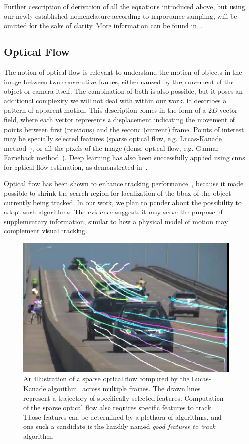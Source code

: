 Further description of derivation of all the equations introduced above, but using our newly established nomenclature according to importance sampling, will be omitted for the sake of clarity. More information can be found in~\cite{arulampalam2007particlefilter}.

\subsection{Optical Flow}
\label{ssec:OpticalFlow}

The notion of optical flow is relevant to understand the motion of objects in the image between two consecutive frames, either caused by the movement of the object or camera itself. The combination of both is also possible, but it poses an additional complexity we will not deal with within our work. It describes a pattern of apparent motion. This description comes in the form of a $2D$ vector field, where each vector represents a displacement indicating the movement of points between first (previous) and the second (current) frame. Points of interest may be specially selected features (sparse optical flow, e.g. Lucas-Kanade method~\cite{lucas1981lucaskanade}), or all the pixels of the image (dense optical flow, e.g. Gunnar-Farneback method~\cite{farneback2003motion}). Deep learning has also been successfully applied using \glspl{cnn} for optical flow estimation, as demonstrated in~\cite{dosovitskiy2015flownet}.

Optical flow has been shown to enhance tracking performance~\cite{lealtaixe2016siameseassoc}, because it made possible to shrink the search region for localization of the \gls{bbox} of the object currently being tracked. In our work, we plan to ponder about the possibility to adopt such algorithms. The evidence suggests it may serve the purpose of supplementary information, similar to how a physical model of motion may complement visual tracking.

\begin{figure}[t]
    \centerline{\includegraphics[width=0.5\linewidth]{figures/theoretical_foundations/opticalflow_lk.jpg}}
    \caption[Sparse optical flow]{An illustration of a sparse optical flow computed by the Lucas-Kanade algorithm~\cite{lucas1981lucaskanade} across multiple frames. The drawn lines represent a trajectory of specifically selected features. Computation of the sparse optical flow also requires specific features to track. Those features can be determined by a plethora of algorithms, and one such a candidate is the handily named \emph{good features to track}~\cite{shi1994goodfeatures} algorithm. }
    \label{fig:OpticalFlowLucasKanade}
\end{figure}

